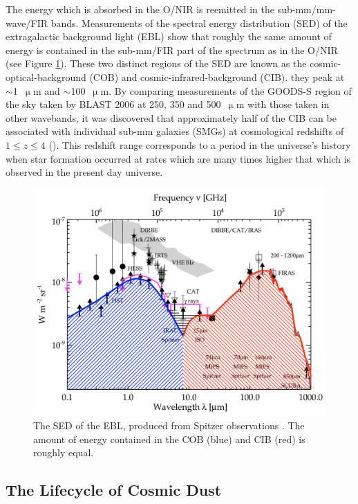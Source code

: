 The energy which is absorbed in the O/NIR is reemitted in the sub-mm/mm-wave/FIR bands. Measurements of the spectral energy distribution (SED) of the extragalactic background light (EBL) show that roughly the same amount of energy is contained in the sub-mm/FIR part of the spectrum as in the O/NIR (see Figure \ref{fig:EBL}). These two distinct regions of the SED are known as the cosmic-optical-background (COB) and cosmic-infrared-background (CIB). they peak at $\sim$1~$\upmu$m and $\sim$100~$\upmu$m. By comparing measurements of the GOODS-S region of the sky taken by BLAST 2006 at 250, 350 and 500~$\upmu$m with those taken in other wavebands, it was discovered that approximately half of the CIB can be associated with individual sub-mm galaxies (SMGs) at cosmological redshifts of $1 \leq z \leq 4$ (\citet{devlin2009over,marsden2009blast,pascale2009blast}). This redshift range corresponds to a period in the universe's history when star formation occurred at rates which are many times higher that which is observed in the present day universe.

\begin{figure}[!htbp]
\centering
\includegraphics[width=\textwidth]{figures/intro/cob_cib}
\caption[~The SED of extragalactic background light.]{The SED of the EBL, produced from Spitzer observations \citep{dole2006cosmic}. The amount of energy contained in the COB (blue) and CIB (red) is roughly equal.}
\label{fig:EBL}
\end{figure}

\subsection{The Lifecycle of Cosmic Dust}


